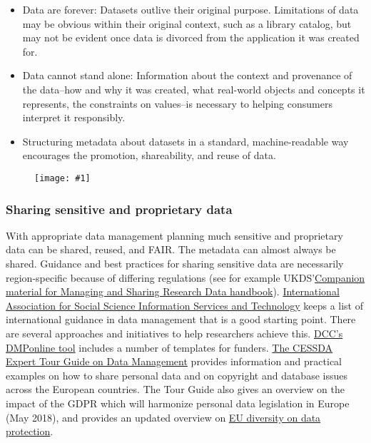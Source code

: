 \documentclass{article}
\newlength{\imgwidth}
\newcommand\scaledgraphics[2]{%
                
\settowidth{\imgwidth}{\texttt{[image: \#1]}}%
                
\setlength{\imgwidth}{\minof{\imgwidth}{#2\textwidth}}%
                
\texttt{[image: \#1]}%
                
}
\begin{document}
\begin{itemize}
\item Data are forever: Datasets outlive their original purpose. Limitations of data may be obvious within their original context, such as a library catalog, but may not be evident once data is divorced from the application it was created for.


\item Data cannot stand alone: Information about the context and provenance of the data--how and why it was created, what real-world objects and concepts it represents, the constraints on values--is necessary to helping consumers interpret it responsibly.


\item Structuring metadata about datasets in a standard, machine-readable way encourages the promotion, shareability, and reuse of data.


\end{itemize}
\begin{figure}
\scaledgraphics{93f2263c-08cc-4ca7-b34b-b629ca50400c.png}{1}
\label{F35548551}
\end{figure}


\subsubsection{\textbf{Sharing sensitive and proprietary data}}\label{sharing-sensitive-and-proprietary-data}



With appropriate data management planning much sensitive and proprietary data can be shared, reused, and FAIR. The metadata can almost always be shared. Guidance and best practices for sharing sensitive data are necessarily region-specific because of differing regulations (see for example UKDS’\href{https://www.ukdataservice.ac.uk/manage-data/handbook}{Companion material for Managing and Sharing Research Data handbook}). \href{http://www.iassistdata.org/resources/data-management/best-practices}{International Association for Social Science Information Services and Technology} keeps a list of international guidance in data management that is a good starting point. There are several approaches and initiatives to help researchers achieve this. \href{http://www.dcc.ac.uk/dmponline}{DCC’s DMPonline tool} includes a number of templates for funders. \href{https://www.cessda.eu/Research-Infrastructure/Training/Expert-tour-guide-on-Data-Management/5.-Protect/Ethics-and-data-protection}{The CESSDA Expert Tour Guide on Data Management} provides information and practical examples on how to share personal data and on copyright and database issues across the European countries. The Tour Guide also gives an overview on the impact of the GDPR which will harmonize personal data legislation in Europe (May 2018), and provides an updated overview on \href{https://www.cessda.eu/Research-Infrastructure/Training/Expert-tour-guide-on-Data-Management/5.-Protect/Processing-personal-data/Diversity-in-data-protection}{EU diversity on data protection}.
\end{document}

